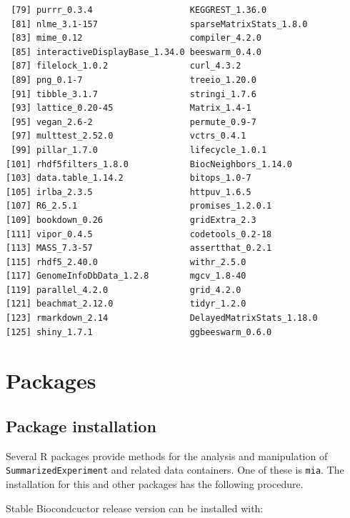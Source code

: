\documentclass[
]{book}
\begin{document}
\begin{verbatim}
 [79] purrr_0.3.4                   KEGGREST_1.36.0              
 [81] nlme_3.1-157                  sparseMatrixStats_1.8.0      
 [83] mime_0.12                     compiler_4.2.0               
 [85] interactiveDisplayBase_1.34.0 beeswarm_0.4.0               
 [87] filelock_1.0.2                curl_4.3.2                   
 [89] png_0.1-7                     treeio_1.20.0                
 [91] tibble_3.1.7                  stringi_1.7.6                
 [93] lattice_0.20-45               Matrix_1.4-1                 
 [95] vegan_2.6-2                   permute_0.9-7                
 [97] multtest_2.52.0               vctrs_0.4.1                  
 [99] pillar_1.7.0                  lifecycle_1.0.1              
[101] rhdf5filters_1.8.0            BiocNeighbors_1.14.0         
[103] data.table_1.14.2             bitops_1.0-7                 
[105] irlba_2.3.5                   httpuv_1.6.5                 
[107] R6_2.5.1                      promises_1.2.0.1             
[109] bookdown_0.26                 gridExtra_2.3                
[111] vipor_0.4.5                   codetools_0.2-18             
[113] MASS_7.3-57                   assertthat_0.2.1             
[115] rhdf5_2.40.0                  withr_2.5.0                  
[117] GenomeInfoDbData_1.2.8        mgcv_1.8-40                  
[119] parallel_4.2.0                grid_4.2.0                   
[121] beachmat_2.12.0               tidyr_1.2.0                  
[123] rmarkdown_2.14                DelayedMatrixStats_1.18.0    
[125] shiny_1.7.1                   ggbeeswarm_0.6.0             
\end{verbatim}

\hypertarget{packages}{%
\chapter{Packages}\label{packages}}

\hypertarget{package-installation}{%
\section{Package installation}\label{package-installation}}

Several R packages provide methods for the analysis and manipulation
of \texttt{SummarizedExperiment} and related data containers. One of these is
\texttt{mia}. The installation for this and other packages has the following
procedure.

Stable Biocondcuctor release version can be installed with:
\end{document}
